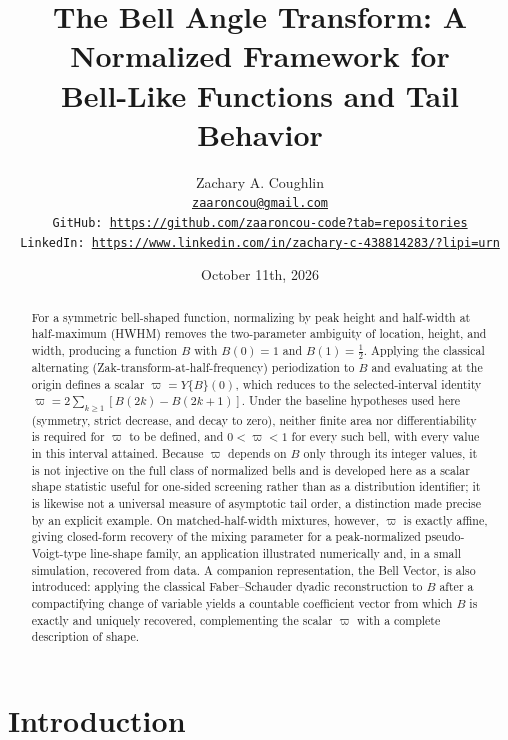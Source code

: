 \documentclass[11pt]{article}
\title{The Bell Angle Transform: A Normalized Framework for\\ Bell-Like Functions and Tail Behavior}
\author{
Zachary A. Coughlin\\
\texttt{\href{mailto:zaaroncou@gmail.com}{zaaroncou@gmail.com}}\\
\texttt{GitHub: \href{https://github.com/zaaroncou-code?tab=repositories}{https://github.com/zaaroncou-code?tab=repositories}}\\
\texttt{LinkedIn: \href{https://www.linkedin.com/in/zachary-c-438814283/?lipi=urn}{https://www.linkedin.com/in/zachary-c-438814283/?lipi=urn}}
}
\date{October 11th, 2026}
\theoremstyle{definition}
\theoremstyle{plain}
\theoremstyle{remark}
\begin{document}
\maketitle

\begin{abstract}
For a symmetric bell-shaped function, normalizing by peak height and half-width at
half-maximum (HWHM) removes the two-parameter ambiguity of location, height, and
width, producing a function $B$ with $B(0)=1$ and $B(1)=\tfrac12$. Applying the
classical alternating (Zak-transform-at-half-frequency) periodization to $B$ and
evaluating at the origin defines a scalar $\varpi=Y\{B\}(0)$, which reduces to the
selected-interval identity $\varpi=2\sum_{k\ge1}[B(2k)-B(2k+1)]$. Under the baseline
hypotheses used here (symmetry, strict decrease, and decay to zero), neither finite
area nor differentiability is required for $\varpi$ to be defined, and $0<\varpi<1$
for every such bell, with every value in this interval attained. Because $\varpi$
depends on $B$ only through its integer values, it is not injective on the full class
of normalized bells and is developed here as a scalar shape statistic useful for
one-sided screening rather than as a distribution identifier; it is likewise not a
universal measure of asymptotic tail order, a distinction made precise by an explicit
example. On matched-half-width mixtures, however, $\varpi$ is exactly affine, giving
closed-form recovery of the mixing parameter for a peak-normalized pseudo-Voigt-type
line-shape family, an application illustrated numerically and, in a small simulation,
recovered from data. A companion representation, the Bell Vector, is also introduced:
applying the classical Faber--Schauder dyadic reconstruction to $B$ after a
compactifying change of variable yields a countable coefficient vector from which $B$
is exactly and uniquely recovered, complementing the scalar $\varpi$ with a complete
description of shape.
\end{abstract}

 
\section{Introduction}
 
\end{document}
